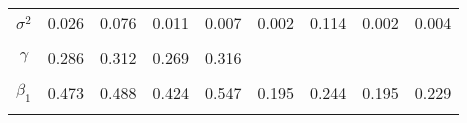 \begin{footnotesize}
\begin{singlespace}
\begin{tabular}{ccccccccc}
$ \sigma^{2} $ & 0.026 & 0.076 & 0.011 & 0.007 & 0.002 & 0.114 & 0.002 & 0.004 \\ 
 & \begin{tiny} [0.018,0.035] \end{tiny}  & \begin{tiny} [0.05,0.097] \end{tiny}  & \begin{tiny} [0.006,0.015] \end{tiny}  & \begin{tiny} [0.004,0.011] \end{tiny}  & \begin{tiny} [0.002,0.003] \end{tiny}  & \begin{tiny} [0.098,0.129] \end{tiny}  & \begin{tiny} [0.002,0.003] \end{tiny}  & \begin{tiny} [0.003,0.006] \end{tiny}  \\ 
$\gamma$ & 0.286 & 0.312 & 0.269 & 0.316 &  &  &  &  \\ 
 & \begin{tiny} [0.276,0.297] \end{tiny}  & \begin{tiny} [0.303,0.322] \end{tiny}  & \begin{tiny} [0.257,0.283] \end{tiny}  & \begin{tiny} [0.308,0.325] \end{tiny}  &  &  &  &  \\ 
$ \beta_{1} $ & 0.473 & 0.488 & 0.424 & 0.547 & 0.195 & 0.244 & 0.195 & 0.229 \\ 
 & \begin{tiny} [0.357,0.591] \end{tiny}  & \begin{tiny} [0.385,0.589] \end{tiny}  & \begin{tiny} [0.312,0.546] \end{tiny}  & \begin{tiny} [0.375,0.722] \end{tiny}  & \begin{tiny} [0.124,0.266] \end{tiny}  & \begin{tiny} [0.207,0.281] \end{tiny}  & \begin{tiny} [0.121,0.266] \end{tiny}  & \begin{tiny} [0.16,0.295] \end{tiny}  \\ 

\end{tabular}
\end{singlespace}
\end{footnotesize}
